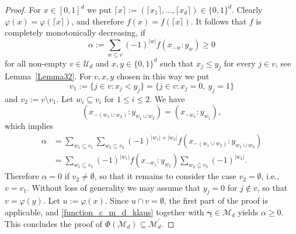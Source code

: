 \documentclass[10pt,a4paper]{amsart}
\newcommand{\M}  {\mathcal{M}}
\newcommand{\U}  {\mathcal{U}}
\newcommand{\bg}{{\boldsymbol{\gamma}}}
\begin{document}
\begin{proof}
For $x \in [0,1]^d$ we put 
$\lceil x \rceil := (\lceil x_1 \rceil, \dots, \lceil x_d \rceil) 
\in \{0,1\}^d$. Clearly $\varphi(x) = \varphi(\lceil x \rceil)$,
and therefore $f(x) = f(\lceil x \rceil)$. It follows that $f$ is 
completely monotonically decreasing, if 
\[
\alpha := \sum_{w \subseteq v} (-1)^{|w|} f(x_{-w}\!:\!y_w) \geq 0
\]
for all non-empty $v\in \U_d$ and $x, y\in \{0,1\}^d$ 
such that $x_j \leq y_j$ for every $j \in v$, see Lemma~\ref{Lemma32}.
For $v,x,y$ chosen in this way we put
\[
v_1 := \{j \in v : x_j < y_j\} = \{j \in v : x_j = 0,\ y_j=1\}
\]
and $v_2 := v \setminus v_1$.
Let $w_i \subseteq v_i$ for $1\le i\le 2$. We have
\[
(x_{-(w_1 \cup w_2)}\!:\! y_{w_1 \cup w_2}) = (x_{-w_1}\!:\!y_{w_1}),
\]
which implies
\begin{align*}
\alpha &=
\sum_{w_1 \subseteq v_1} \sum_{w_2 \subseteq v_2}
(-1)^{|w_1|+|w_2|} f(x_{-(w_1\cup w_2)}\!:\!y_{w_1\cup w_2})\\
&=
\sum_{w_1 \subseteq v_1} (-1)^{|w_1|} f(x_{-w_1}\!:\!y_{w_1})
\sum_{w_2 \subseteq v_2} (-1)^{|w_2|}.
\end{align*}
Therefore $\alpha = 0$ if $v_2 \neq \emptyset$, so that
it remains to consider the case $v_2 = \emptyset$, i.e., $v = v_1$.
Without loss of generality we may assume that $y_j = 0$ for
$j \not\in v$, so that $v = \varphi(y)$. Let $u := \varphi(x)$.
Since $u \cap v = \emptyset$, the first part of the proof is
applicable, and \eqref{function_c_m_d_klaus} together with $\bg \in
\M_d$ yields $\alpha \geq 0$. This concludes the proof of
$\Phi(\M_d) \subseteq \M_d^\prime$.
\end{proof}
\end{document}

